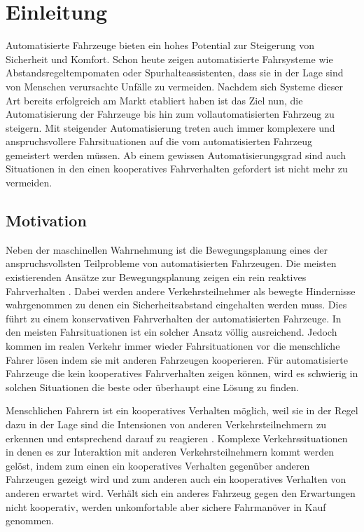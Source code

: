 
\chapter{Einleitung}
\label{sec:introduction}


Automatisierte Fahrzeuge bieten ein hohes Potential zur Steigerung von Sicherheit und Komfort.
Schon heute zeigen automatisierte Fahrsysteme wie Abstandsregeltempomaten oder Spurhalteassistenten, dass sie in der Lage sind von Menschen verursachte Unf\"alle zu vermeiden.
Nachdem sich Systeme dieser Art bereits erfolgreich am Markt etabliert haben ist das Ziel nun, die Automatisierung der Fahrzeuge bis hin zum vollautomatisierten Fahrzeug zu steigern.
Mit steigender Automatisierung treten auch immer komplexere und anspruchsvollere Fahrsituationen auf die vom automatisierten Fahrzeug gemeistert werden m\"ussen.
Ab einem gewissen Automatisierungsgrad sind auch Situationen in den einen kooperatives Fahrverhalten gefordert ist nicht mehr zu vermeiden.

\section{Motivation}
Neben der maschinellen Wahrnehmung ist die Bewegungsplanung eines der anspruchsvollsten Teilprobleme von automatisierten Fahrzeugen.
Die meisten existierenden Ans\"atze zur Bewegungsplanung zeigen ein rein reaktives Fahrverhalten \cite{Lenz2016}.
Dabei werden andere Verkehrsteilnehmer als bewegte Hindernisse wahrgenommen zu denen ein Sicherheitsabstand eingehalten werden muss.
Dies f\"uhrt zu einem konservativen Fahrverhalten der automatisierten Fahrzeuge.
In den meisten Fahrsituationen ist ein solcher Ansatz v\"ollig ausreichend.
Jedoch kommen im realen Verkehr immer wieder Fahrsituationen vor die menschliche Fahrer l\"osen indem sie mit anderen Fahrzeugen kooperieren.
F\"ur automatisierte Fahrzeuge die kein kooperatives Fahrverhalten zeigen k\"onnen, wird es schwierig in solchen Situationen die beste oder \"uberhaupt eine L\"osung zu finden.

Menschlichen Fahrern ist ein kooperatives Verhalten m\"oglich, weil sie in der Regel dazu in der Lage sind die Intensionen von anderen Verkehrsteilnehmern zu erkennen und entsprechend darauf zu reagieren \cite{Wei2013}.
Komplexe Verkehrssituationen in denen es zur Interaktion mit anderen Verkehrsteilnehmern kommt werden gel\"ost, indem zum einen ein kooperatives Verhalten gegen\"uber anderen Fahrzeugen gezeigt wird und zum anderen auch ein kooperatives Verhalten von anderen erwartet wird.
Verh\"alt sich ein anderes Fahrzeug gegen den Erwartungen nicht kooperativ, werden unkomfortable aber sichere Fahrman\"over in Kauf genommen.

